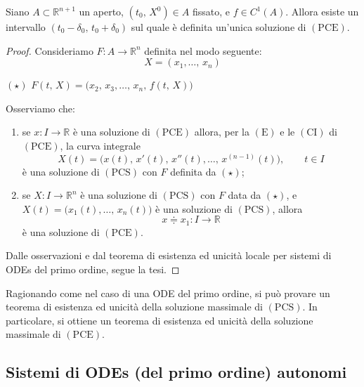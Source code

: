 \begin{cor}
Siano $A \subset \mathbb{R}^{n+1}$ un aperto, $(t_0,\,X^0) \in A$ fissato, e $f \in C^1(A)$. Allora esiste un intervallo $(t_0-\delta_0,\,t_0+\delta_0)$ sul quale è definita un'unica soluzione di $\mathrm{(PCE)}$.
\end{cor}
\begin{proof}
Consideriamo $F : A \longrightarrow \mathbb{R}^n$ definita nel modo seguente:
$$
X = (x_1,\ldots,\,x_n)
$$
\begin{center}
$\mathrm{(\star)}$
\hfill
$\displaystyle
F(t,\,X) = \Big( x_2,\,x_3,\ldots,\,x_n,\,f(t,\,X) \Big)
$
\hfill \null \\
\end{center}
Osserviamo che:
\begin{enumerate}[labelindent=\parindent,leftmargin=*,label=\textnormal{(\roman*)},start=1]
\item se $x : I \longrightarrow \mathbb{R}$ è una soluzione di $\mathrm{(PCE)}$ allora, per la $\mathrm{(E)}$ e le $\mathrm{(CI)}$ di $\mathrm{(PCE)}$, la curva integrale
$$
X(t) = \Big( x(t),\,x'(t),\,x''(t),\ldots,\,x^{(n-1)}(t) \Big), \qquad t \in I
$$
è una soluzione di $\mathrm{(PCS)}$ con $F$ definita da $\mathrm{(\star)}$;
\item se $X : I \longrightarrow \mathbb{R}^n$ è una soluzione di $\mathrm{(PCS)}$ con $F$ data da $\mathrm{(\star)}$, e $X(t) = \Big( x_1(t),\ldots,\,x_n(t) \Big)$ è una soluzione di $\mathrm{(PCS)}$, allora
$$
x \doteqdot x_1 : I \longrightarrow \mathbb{R}
$$
è una soluzione di $\mathrm{(PCE)}$.
\end{enumerate}
Dalle osservazioni e dal teorema di esistenza ed unicità locale per sistemi di ODEs del primo ordine, segue la tesi.
\end{proof}

\begin{obs}
Ragionando come nel caso di una ODE del primo ordine, si può provare un teorema di esistenza ed unicità della soluzione massimale di $\mathrm{(PCS)}$. In particolare, si ottiene un teorema di esistenza ed unicità della soluzione massimale di $\mathrm{(PCE)}$.
\end{obs}




\subsection{Sistemi di ODEs (del primo ordine) autonomi}

